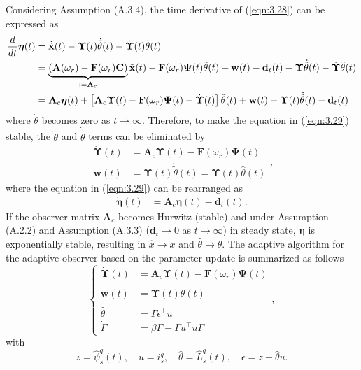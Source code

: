 Considering Assumption (A.3.4), the time derivative of (\ref{eqn:3.28}) can be expressed as 
\begin{align}\label{eqn:3.29}
\frac{d}{dt}{\boldsymbol{\eta}}(t) &= \dot{\tilde{\mathbf{x}}}(t) - \mathbf{\Upsilon}(t) \dot{\tilde{\theta}}(t) - \dot{\mathbf{\Upsilon}}(t) \tilde{\theta}(t) \\\notag
&= \underbrace{(\mathbf{A}(\omega_r) - \mathbf{F}(\omega_r)\mathbf{C})}_{:= \mathbf{A}_c} \tilde{\mathbf{x}}(t) - \mathbf{F}(\omega_r)\mathbf{\Psi}(t) \tilde{\theta}(t) +\mathbf{w}(t) - {\mathbf{d}_{t}}(t) 
-\mathbf{\Upsilon} \dot{\tilde{\theta}}(t) - \dot{\mathbf{\Upsilon}} \tilde{\theta}(t) \\\notag
&= \mathbf{A}_c {\boldsymbol{\eta}}(t)+ \left[ \mathbf{A}_c \mathbf{\Upsilon}(t) - \mathbf{F}(\omega_r)\mathbf{\Psi}(t) - \dot{\mathbf{\Upsilon}}(t) \right] \tilde{\theta}(t) + \mathbf{w}(t) - \mathbf{\Upsilon}(t) \dot{\tilde{\theta}}(t) 
- {\mathbf{d}_{t}}(t)
\end{align}
where \(\dot{\theta}\) becomes zero as \( t \rightarrow \infty \). Therefore, to make the equation in (\ref{eqn:3.29}) stable, the \(\tilde{\theta}\) and \(\dot{\tilde{\theta}}\) terms can be eliminated by
\begin{equation}\label{eqn:3.30}
\begin{aligned}
\dot{\mathbf{\Upsilon}}(t) &= \mathbf{A}_c \mathbf{\Upsilon}(t) - \mathbf{F}(\omega_r) \mathbf{\Psi}(t)\\
    \mathbf{w}(t) &= \mathbf{\Upsilon}(t) \dot{\tilde{\theta}}(t)=\mathbf{\Upsilon}(t)\dot{\hat{\theta}}(t)
\end{aligned},
\end{equation}
where the equation in (\ref{eqn:3.29}) can be rearranged as 
\begin{align}\label{eqn:3.31}
\dot{\boldsymbol{\eta}}(t) &=  \mathbf{A}_c \boldsymbol{\eta}(t) 
- {\mathbf{d}_{t}}(t).
\end{align}
If the observer matrix \(\mathbf{A}_c\)  becomes Hurwitz (stable) and under Assumption (A.2.2) and Assumption (A.3.3) (${\mathbf{d}_{t}}\rightarrow 0$ as $ t \rightarrow \infty$) in steady state, \(\boldsymbol{\eta}\) is exponentially stable, resulting in \(\hat{x} \rightarrow x\) and \(\hat{\theta} \rightarrow \theta\). The adaptive algorithm for the adaptive observer based on the parameter update is summarized as follows
\begin{equation}\label{eqn:3.34}
\left\{
\begin{aligned}
\dot{\mathbf{\Upsilon}}(t) &= \mathbf{A}_c \mathbf{\Upsilon}(t) - \mathbf{F}(\omega_r) \mathbf{\Psi}(t)\\
    \mathbf{w}(t) &=\mathbf{\Upsilon}(t)\dot{\hat{\theta}}(t)
    \\
        \dot{\hat\theta} &= \Gamma \epsilon^\top u\\
    \dot{\Gamma} &= \beta \Gamma - \Gamma u^\top u \Gamma
\end{aligned},
\right.
\end{equation}
with
\begin{equation*}
z = \hat\psi^q_s(t),\quad u = i^q_s, \quad \hat{\theta} = \hat{L}^q_s(t) , \quad \epsilon =z - \hat{\theta}u.
\end{equation*}

